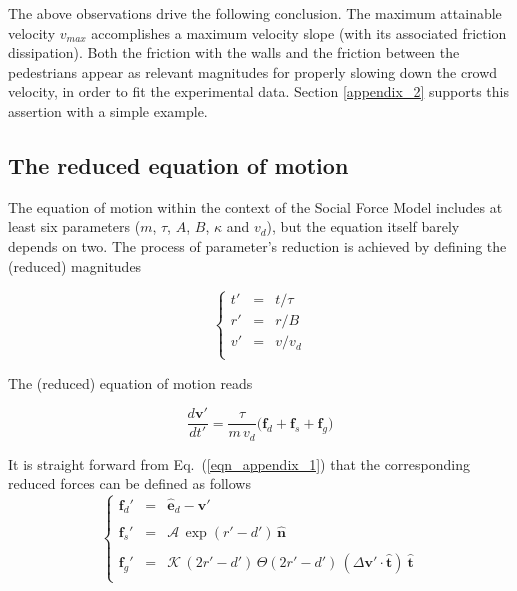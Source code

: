 \documentclass[preprint,12pt]{elsarticle}
\begin{document}
The above observations drive the following conclusion. The maximum attainable velocity $v_{max}$ accomplishes a maximum velocity slope (with its associated friction dissipation). Both the friction with the walls and the friction between the pedestrians appear as relevant magnitudes for properly slowing down the crowd velocity, in order to fit the experimental data. Section \ref{appendix_2} supports this assertion with a simple example.  


\subsection{\label{appendix_1}The reduced equation of motion}

The equation of motion within the context of the Social 
Force Model includes at least six parameters ($m$, $\tau$, $A$, $B$, 
$\kappa$ and $v_d$), but the equation itself barely depends on two. The process 
of parameter's reduction is achieved by defining the (reduced) magnitudes 

\begin{equation}
 \left\{\begin{array}{lll}
         t' & = & t/\tau \\
         r' & =& r/B \\
         v' & = & v/v_d \\
        \end{array}\right.
\end{equation}

The (reduced) equation of motion reads 


\begin{equation}
\displaystyle\frac{d\mathbf{v}'}{dt'}=
\displaystyle\frac{\tau}{m\,v_d}\bigg(\mathbf{f}_d+
\mathbf{f}_s+\mathbf{f}_g\bigg)\label{eqn_appendix_1}
\end{equation}

It is straight forward from Eq.~(\ref{eqn_appendix_1}) that the 
corresponding reduced forces can 
be defined as follows\\

\begin{equation}
 \left\{\begin{array}{lll}
         \mathbf{f}_d' & = & \hat{\mathbf{e}}_d-\mathbf{v}' \\
         && \\
         \mathbf{f}_s' & =& \mathcal{A}\,\exp(r'-d')\,\hat{\mathbf{n}} \\
         && \\
         \mathbf{f}_g' & = & 
\mathcal{K}\,(2r'-d')\,\Theta(2r'-d')\,(\Delta\mathbf{v}'\cdot\hat{\mathbf{t}})\
 
\hat{\mathbf{t}} \\
        \end{array}\right.\label{eqn_appendix_2}
\end{equation}
\end{document}
